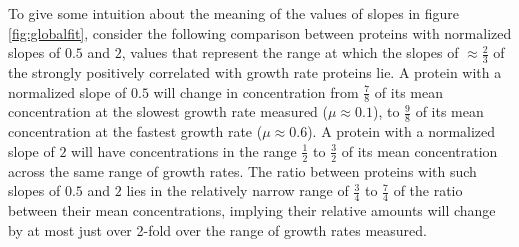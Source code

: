 To give some intuition about the meaning of the values of slopes in figure \ref{fig:globalfit}, consider the following comparison between proteins with normalized slopes of $0.5$ and $2$, values that represent the range at which the slopes of $\approx \frac{2}{3}$ of the strongly positively correlated with growth rate proteins lie.
A protein with a normalized slope of $0.5$ will change in concentration from $\frac{7}{8}$ of its mean concentration at the slowest growth rate measured ($\mu \approx 0.1$), to $\frac{9}{8}$ of its mean concentration at the fastest growth rate ($\mu \approx 0.6$).
A protein with a normalized slope of $2$ will have concentrations in the range $\frac{1}{2}$ to $\frac{3}{2}$ of its mean concentration across the same range of growth rates.
The ratio between proteins with such slopes of $0.5$ and $2$ lies in the relatively narrow range of $\frac{3}{4}$ to $\frac{7}{4}$ of the ratio between their mean concentrations, implying their relative amounts will change by at most just over 2-fold over the range of growth rates measured.